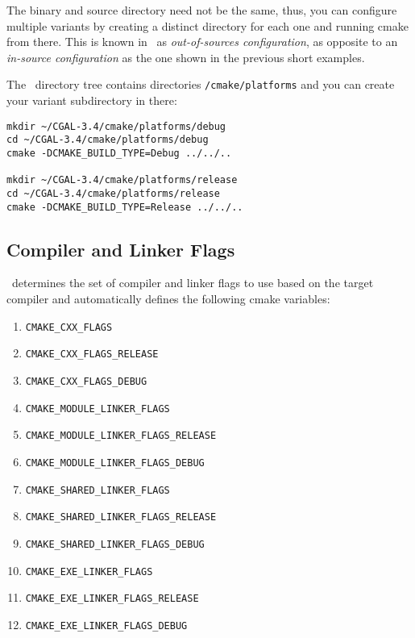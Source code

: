 The binary and source directory need not be the same, thus, you can configure multiple variants by creating a
distinct directory for each one and running cmake from there. This is known in \cmake\ as 
{\em out-of-sources configuration}, as opposite to an {\em in-source configuration} as the one shown in the 
previous short examples.

The \cgal\ directory tree contains directories \cgaldir{}\texttt{/cmake/platforms} and you can create your 
variant subdirectory in there:

{\ccTexHtml{\scriptsize}{}
\begin{verbatim}
mkdir ~/CGAL-3.4/cmake/platforms/debug
cd ~/CGAL-3.4/cmake/platforms/debug
cmake -DCMAKE_BUILD_TYPE=Debug ../../..

mkdir ~/CGAL-3.4/cmake/platforms/release
cd ~/CGAL-3.4/cmake/platforms/release
cmake -DCMAKE_BUILD_TYPE=Release ../../..
\end{verbatim}
}

\subsection{Compiler and Linker Flags}

\cmake\ determines the set of compiler and linker flags to use based on the target compiler and automatically defines
the following cmake variables:

\begin{enumerate}
\item \texttt{CMAKE\_CXX\_FLAGS}
\item \texttt{CMAKE\_CXX\_FLAGS\_RELEASE}
\item \texttt{CMAKE\_CXX\_FLAGS\_DEBUG}
\item \texttt{CMAKE\_MODULE\_LINKER\_FLAGS}
\item \texttt{CMAKE\_MODULE\_LINKER\_FLAGS\_RELEASE}
\item \texttt{CMAKE\_MODULE\_LINKER\_FLAGS\_DEBUG}
\item \texttt{CMAKE\_SHARED\_LINKER\_FLAGS}
\item \texttt{CMAKE\_SHARED\_LINKER\_FLAGS\_RELEASE}
\item \texttt{CMAKE\_SHARED\_LINKER\_FLAGS\_DEBUG}
\item \texttt{CMAKE\_EXE\_LINKER\_FLAGS}
\item \texttt{CMAKE\_EXE\_LINKER\_FLAGS\_RELEASE}
\item \texttt{CMAKE\_EXE\_LINKER\_FLAGS\_DEBUG}
 \end{enumerate}

